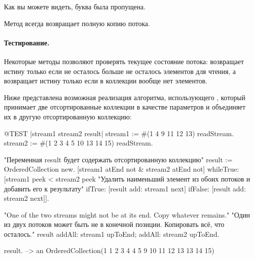 \documentclass[a4paper,10pt,twoside]{book}
\begin{document}

Как вы можете видеть, буква  была пропущена.

Метод  всегда возвращает полную копию потока.

\paragraph{Тестирование.} Некоторые методы позволяют проверять текущее состояние потока:  возвращает истину только если не осталось больше не осталось элементов для чтения, а  возвращает истину только если в коллекции вообще нет элементов.

Ниже представлена возможная реализация алгоритма, использующего , который принимает две отсортированные коллекции в качестве параметров и объединяет их в другую отсортированную коллекцию:

\begin{code}{@TEST |stream1 stream2 result|}
stream1 := #(1 4 9 11 12 13) readStream.
stream2 := #(1 2 3 4 5 10 13 14 15) readStream.

"Переменная result будет содержать отсортированную коллекцию"
result := OrderedCollection new.
[stream1 atEnd not & stream2 atEnd not]
  whileTrue: [stream1 peek < stream2 peek
 	"Удалить наименьший элемент из обоих потоков и добавить его к результату"
    ifTrue: [result add: stream1 next]
    ifFalse: [result add: stream2 next]].

"One of the two streams might not be at its end. Copy whatever remains."
"Один из двух потоков может быть не в конечной позиции. Копировать всё, что осталось."
result
  addAll: stream1 upToEnd;
  addAll: stream2 upToEnd.

result. -->   an OrderedCollection(1 1 2 3 4 4 5 9 10 11 12 13 13 14 15)
\end{code}
\end{document}
